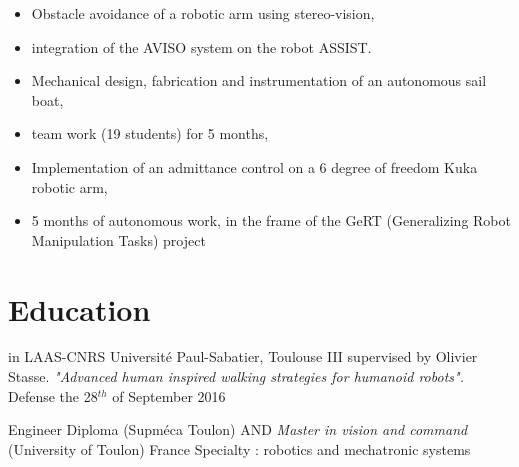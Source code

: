 \documentclass[11pt,a4paper]{moderncv}
\newcommand{\items}{\item[*] \hspace{2mm}}
\begin{document}
{
\begin{itemize}%
\items Obstacle avoidance of a robotic arm using stereo-vision,
\items integration of the AVISO system on the robot ASSIST.
\newline{}
\end{itemize}
}

{
\begin{itemize}%
\items Mechanical design, fabrication and instrumentation of an autonomous sail boat,
\items team work (19 students) for 5 months,
\newline{}
\end{itemize}
}

{
\begin{itemize}%
\items Implementation of an admittance control on a 6 degree of freedom Kuka robotic arm,
\items 5 months of autonomous work, in the frame of the GeRT (Generalizing Robot Manipulation Tasks) project
\newline{}
\end{itemize}
}

\section{Education}

{in LAAS-CNRS}
{Universit\'e Paul-Sabatier, Toulouse III}
{supervised by Olivier Stasse. \textit{"Advanced human inspired walking strategies for humanoid robots".} Defense the 28$^{th}$ of September 2016}
{}

{Engineer Diploma (Supm\'eca Toulon) AND \emph{Master in vision and command} (University of Toulon)}
{France}
{}
{Specialty : robotics and mechatronic systems}


%

\end{document}
